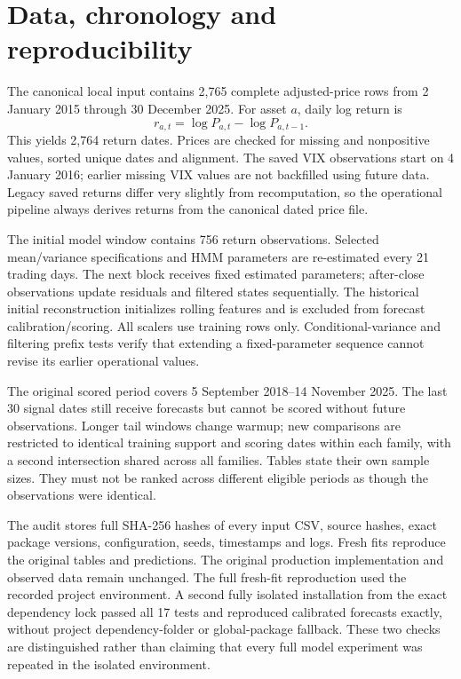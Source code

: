 \documentclass[11pt]{article}
\begin{document}
\section{Data, chronology and reproducibility}
The canonical local input contains 2,765 complete adjusted-price rows from 2 January 2015 through
30 December 2025. For asset $a$, daily log return is
\begin{equation}r_{a,t}=\log P_{a,t}-\log P_{a,t-1}.\end{equation}
This yields 2,764 return dates. Prices are checked for missing and nonpositive values, sorted unique
dates and alignment. The saved VIX observations start on 4 January 2016; earlier missing VIX values
are not backfilled using future data. Legacy saved returns differ very slightly from recomputation,
so the operational pipeline always derives returns from the canonical dated price file.

The initial model window contains 756 return observations. Selected mean/variance specifications and
HMM parameters are re-estimated every 21 trading days. The next block receives fixed estimated
parameters; after-close observations update residuals and filtered states sequentially. The historical
initial reconstruction initializes rolling features and is excluded from forecast calibration/scoring.
All scalers use training rows only. Conditional-variance and filtering prefix tests verify that extending
a fixed-parameter sequence cannot revise its earlier operational values.

The original scored period covers 5 September 2018--14 November 2025. The last 30 signal dates still
receive forecasts but cannot be scored without future observations. Longer tail windows change warmup;
new comparisons are restricted to identical training support and scoring dates within each family, with
a second intersection shared across all families. Tables state their own sample sizes. They must not be
ranked across different eligible periods as though the observations were identical.

The audit stores full SHA-256 hashes of every input CSV, source hashes, exact package versions,
configuration, seeds, timestamps and logs. Fresh fits reproduce the original tables and predictions.
The original production implementation and observed data remain unchanged. The full fresh-fit
reproduction used the recorded project environment. A second fully isolated installation from
the exact dependency lock passed all 17 tests and reproduced calibrated forecasts exactly,
without project dependency-folder or global-package fallback. These two checks are distinguished
rather than claiming that every full model experiment was repeated in the isolated environment.
\end{document}
